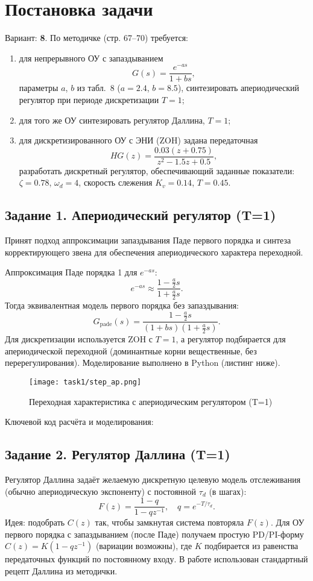 
\chapter{Постановка задачи}
Вариант: \textbf{8}. По методичке (стр. 67–70) требуется:
\begin{enumerate}
    \item для непрерывного ОУ с запаздыванием
    \[
        G(s) = \frac{e^{-a s}}{1 + b s},
    \]
    параметры $a$, $b$ из табл.~8 ($a=2.4$, $b=8.5$), синтезировать апериодический регулятор при периоде дискретизации $T=1$;
    \item для того же ОУ синтезировать регулятор Даллина, $T=1$;
    \item для дискретизированного ОУ с ЭНИ (ZOH) задана передаточная
    \[
        HG(z)= \frac{0.03(z+0.75)}{z^2 - 1.5 z + 0.5},
    \]
    разработать дискретный регулятор, обеспечивающий заданные показатели: $\zeta=0.78$, $\omega_d=4$, скорость слежения $K_v=0.14$, $T=0.45$.
\end{enumerate}

\section{Задание 1. Апериодический регулятор (T=1)}
Принят подход аппроксимации запаздывания Паде первого порядка и синтеза корректирующего звена для обеспечения апериодического характера переходной.

Аппроксимация Паде порядка 1 для $e^{-a s}$:
\[
    e^{-a s} \approx \frac{1 - \tfrac{a}{2} s}{1 + \tfrac{a}{2} s}.
\]
Тогда эквивалентная модель первого порядка без запаздывания:
\[
    G_{\text{pade}}(s) = \frac{1 - \tfrac{a}{2} s}{(1+b s)(1 + \tfrac{a}{2} s)}.
\]
Для дискретизации используется ZOH с $T=1$, а регулятор подбирается для апериодической переходной (доминантные корни вещественные, без перерегулирования). Моделирование выполнено в Python (листинг ниже).

\begin{figure}[H]
    \centering
    \texttt{[image: task1/step\_ap.png]}
    \caption{Переходная характеристика с апериодическим регулятором (T=1)}
\end{figure}

\noindent Ключевой код расчёта и моделирования:


\section{Задание 2. Регулятор Даллина (T=1)}
Регулятор Даллина задаёт желаемую дискретную целевую модель отслеживания (обычно апериодическую экспоненту) с постоянной $\tau_d$ (в шагах):
\[
    F(z) = \frac{1 - q}{1 - q z^{-1}}, \quad q = e^{-T/\tau_d}.
\]
Идея: подобрать $C(z)$ так, чтобы замкнутая система повторяла $F(z)$. Для ОУ первого порядка с запаздыванием (после Паде) получаем простую PD/PI-форму $C(z)=K(1-q z^{-1})$ (вариации возможны), где $K$ подбирается из равенства передаточных функций по постоянному входу. В работе использован стандартный рецепт Даллина из методички.

